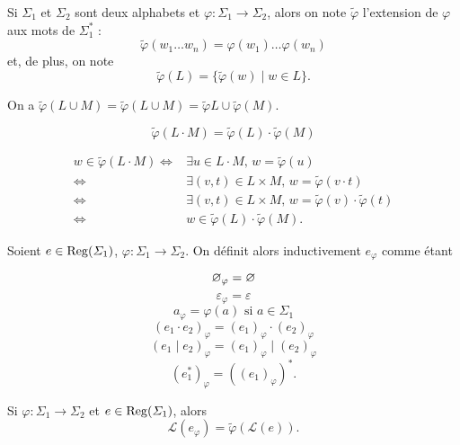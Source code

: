 \begin{rmk}[Notation]
	Si $\Sigma_1$\/ et $\Sigma_2$\/ sont deux alphabets et $\varphi: \Sigma_1 \to \Sigma_2$, alors on note $\tilde\varphi$\/ l'extension de $\varphi$\/ aux mots de $\Sigma_1^*$\/ : \[
		\tilde\varphi(w_1\ldots w_n) = \varphi(w_1)\ldots\varphi(w_n)
	\] et, de plus, on note \[
		\tilde\varphi(L) = \{\tilde\varphi(w)  \mid w \in L\}
	.\]
\end{rmk}

\begin{rmk}
	On a $\tilde\varphi(L \cup M) =\tilde{\varphi}(L \cup M) =\tilde{\varphi}L \cup \tilde\varphi(M)$.
\end{rmk}

\begin{prop}
	\[\tilde\varphi(L \cdot M) = \tilde\varphi(L)\cdot \tilde\varphi(M)\]
\end{prop}

\begin{prv}
	\begin{align*}
		w \in \tilde\varphi(L\cdot M) \iff& \exists u \in L \cdot M,\,w = \tilde\varphi(u)\\
		\iff& \exists (v,t) \in L \times M,\,w = \tilde\varphi(v\cdot t)\\
		\iff& \exists (v,t) \in L \times M,\,w = \tilde\varphi(v) \cdot\tilde\varphi(t)\\
		\iff& w \in \tilde\varphi(L) \cdot \tilde\varphi(M).
	\end{align*}
\end{prv}

\begin{defn}
	Soient $e \in \operatorname{Reg}(\varSigma_1)$, $\varphi : \Sigma_1 \to \Sigma_2$. On définit alors inductivement $e_\varphi$\/ comme étant
	\begin{multicols}{3}
		\[
			\varnothing_\varphi = \varnothing
		\] \[
			\varepsilon_\varphi = \varepsilon
		\] \[
			a_\varphi = \varphi(a) \text{ si } a \in \Sigma_1
		\] \[
			(e_1 \cdot e_2)_\varphi = (e_1)_\varphi \cdot (e_2)_\varphi
		\] \[
			(e_1  \mid e_2)_\varphi = (e_1)_\varphi  \mid (e_2)_\varphi
		\] \[
			(e_1^*)_\varphi = ((e_1)_\varphi)^*.
		\]
	\end{multicols}
\end{defn}

\begin{prop}
	Si $\varphi : \Sigma_1 \to \Sigma_2$\/ et $e \in \operatorname{Reg}(\varSigma_1)$, alors \[
		\mathcal{L}(e_\varphi) = \tilde{\varphi}(\mathcal{L}(e))
	.\]
\end{prop}

